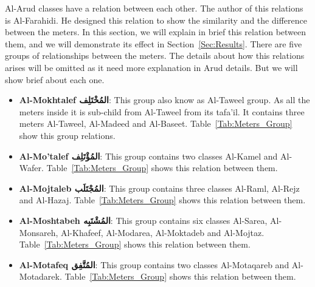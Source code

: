 Al-Arud classes have a relation between each other. The author of this relations is Al-Farahidi. He designed this relation to show the similarity and the difference between the meters. In this section, we will explain in brief this relation between them, and we will demonstrate its effect in Section~\ref{Sec:Results}. There are five groups of relationships between the meters. The details about how this relations arises will be omitted as it need more explanation in Arud details. But we will show brief about each one.
\begin{itemize}
  \item \textbf{Al-Mokhtalef \textarabic{المُخْتَلِف}}: This group also know as Al-Taweel group. As all the meters inside it is sub-child from Al-Taweel from its tafa'il. It contains three meters Al-Taweel, Al-Madeed and Al-Baseet. Table~\ref{Tab:Meters_Group} show this group relations.
  \item \textbf{Al-Mo'talef \textarabic{المُؤْتَلِف}}: This group contains two classes Al-Kamel and Al-Wafer. Table~\ref{Tab:Meters_Group} shows this relation between them.%
  \item \textbf{Al-Mojtaleb \textarabic{المُجْتَلَب}}: This group contains three classes Al-Raml, Al-Rejz and Al-Hazaj. Table~\ref{Tab:Meters_Group} shows this relation between them.
  \item \textbf{Al-Moshtabeh \textarabic{المُشْتَبِه}}: This group contains six classes Al-Sarea, Al-Monsareh, Al-Khafeef, Al-Modarea, Al-Moktadeb and Al-Mojtaz. Table~\ref{Tab:Meters_Group} shows this relation between them.
  \item \textbf{Al-Motafeq \textarabic{المُتَّفِق}}: This group contains two classes Al-Motaqareb and Al-Motadarek. Table~\ref{Tab:Meters_Group} shows this relation between them.%


\end{itemize}
